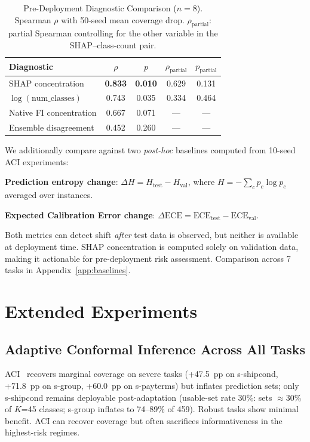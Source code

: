 \documentclass{uai2026} %
\begin{document}
\begin{table}[t]
\centering
\caption{Pre-Deployment Diagnostic Comparison ($n=8$). Spearman $\rho$ with 50-seed mean coverage drop. $\rho_{\text{partial}}$: partial Spearman controlling for the other variable in the SHAP--class-count pair.}\label{tab:diagnostic_comparison}
\small
\begin{tabular}{@{}lcccc@{}}
\toprule
Diagnostic & $\rho$ & $p$ & $\rho_{\text{partial}}$ & $p_{\text{partial}}$ \\
\midrule
SHAP concentration & \textbf{0.833} & \textbf{0.010} & 0.629 & 0.131 \\
$\log(\text{num\_classes})$ & 0.743 & 0.035 & 0.334 & 0.464 \\
Native FI concentration & 0.667 & 0.071 & --- & --- \\
Ensemble disagreement & 0.452 & 0.260 & --- & --- \\
\bottomrule
\end{tabular}
\end{table}

We additionally compare against two \textit{post-hoc} baselines computed from 10-seed ACI experiments:

\textbf{Prediction entropy change}: $\Delta H = H_{\text{test}} - H_{\text{val}}$, where $H = -\sum_c p_c \log p_c$ averaged over instances.

\textbf{Expected Calibration Error change}: \mbox{$\Delta \text{ECE} = \text{ECE}_{\text{test}} - \text{ECE}_{\text{val}}$}.

Both metrics can detect shift \textit{after} test data is observed, but neither is available at deployment time. SHAP concentration is computed solely on validation data, making it actionable for pre-deployment risk assessment. Comparison across 7 tasks in Appendix~\ref{app:baselines}.

\section{Extended Experiments}\label{sec:extended}

\subsection{Adaptive Conformal Inference Across All Tasks}

ACI~\citep{gibbs2021adaptive} recovers marginal coverage on severe tasks (+47.5~pp on s-shipcond, +71.8~pp on s-group, +60.0~pp on s-payterms) but inflates prediction sets; only s-shipcond remains deployable post-adaptation (usable-set rate 30\%: sets $\approx$30\% of $K$=45 classes; s-group inflates to 74--89\% of 459). Robust tasks show minimal benefit. ACI can recover coverage but often sacrifices informativeness in the highest-risk regimes.
\end{document}
